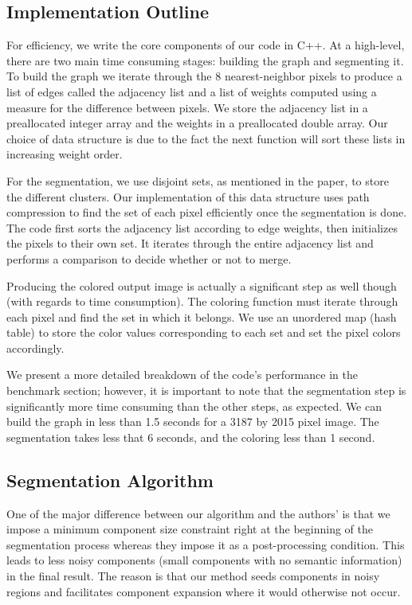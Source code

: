\documentclass[12pt, english, titlepage]{article}
\begin{document}
\subsection{Implementation Outline}

For efficiency, we write the core components of our code in C++. At a high-level, there are two main time consuming stages: building the graph and segmenting it. To build the graph we iterate through the 8 nearest-neighbor pixels to produce a list of edges called the adjacency list and a list of weights computed using a measure for the difference between pixels. We store the adjacency list in a preallocated integer array and the weights in a preallocated double array. Our choice of data structure is due to the fact the next function will sort these lists in increasing weight order.

For the segmentation, we use disjoint sets, as mentioned in the paper, to store the different clusters. Our implementation of this data structure uses path compression to find the set of each pixel efficiently once the segmentation is done. The code first sorts the adjacency list according to edge weights, then initializes the pixels to their own set. It iterates through the entire adjacency list and performs a comparison to decide whether or not to merge.
	
Producing the colored output image is actually a significant step as well though (with regards to time consumption). The coloring function must iterate through each pixel and find the set in which it belongs. We use an unordered map (hash table) to store the color values corresponding to each set and set the pixel colors accordingly.

We present a more detailed breakdown of the code's performance in the benchmark section; however, it is important to note that the segmentation step is significantly more time consuming than the other steps, as expected. We can build the graph in less than 1.5 seconds for a 3187 by 2015 pixel image. The segmentation takes less that 6 seconds, and the coloring less than 1 second.
	
\subsection{ Segmentation Algorithm}

One of the major difference between our algorithm and the authors' is that we impose a minimum component size constraint right at the beginning of the segmentation process whereas they impose it as a post-processing condition. This leads to less noisy components (small components with no semantic information) in the final result. The reason is that our method seeds components in noisy regions and facilitates component expansion where it would otherwise not occur.
\end{document}

